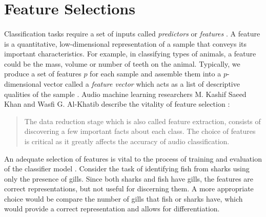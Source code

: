 \documentclass[12pt,letterpaper]{article}
\begin{document}

\newpage
\section{Feature Selections}
\label{sec-Features}

\paragraph*{}Classification tasks require a set of inputs called \textit{predictors} or \textit{features} \cite{James,Loy,Serizel}. A feature is a quantitative, low-dimensional representation of a sample that conveys its important characteristics. For example, in classifying types of animals, a feature could be the mass, volume or number of teeth on the animal. Typically, we produce a set of features $p$ for each sample and assemble them into a $p$-dimensional vector called a \textit{feature vector} which acts as a list of descriptive qualities of the sample \cite{Geron,James}.
Audio machine learning researchers M. Kashif Saeed Khan and Wasfi G. Al-Khatib describe the vitality of feature selection \cite{Khan}:
\begin{quote}
The data reduction stage which is also called feature extraction, consists of discovering a few important facts about each class. The choice of features is critical as it greatly affects the accuracy of audio classification. 
\end{quote}
An adequate selection of features is vital to the process of training and evaluation of the classifier model \cite{Mierswa,Serizel,Liu}. Consider the task of identifying fish from sharks using only the presence of gills. Since both sharks and fish have gills, the features are correct representations, but not useful for discerning them. A more appropriate choice would be compare the number of gills that fish or sharks have, which would provide a correct representation and allows for differentiation.
\end{document}
